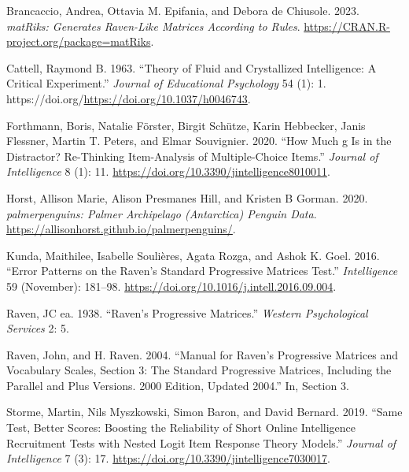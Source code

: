 \label{refs}
\begin{CSLReferences}{1}{0}
Brancaccio, Andrea, Ottavia M. Epifania, and Debora de Chiusole. 2023. \emph{matRiks: Generates Raven-Like Matrices According to Rules}. \url{https://CRAN.R-project.org/package=matRiks}.

Cattell, Raymond B. 1963. {``Theory of Fluid and Crystallized Intelligence: A Critical Experiment.''} \emph{Journal of Educational Psychology} 54 (1): 1. https://doi.org/\url{https://doi.org/10.1037/h0046743}.

Forthmann, Boris, Natalie Förster, Birgit Schütze, Karin Hebbecker, Janis Flessner, Martin T. Peters, and Elmar Souvignier. 2020. {``How {Much} g {Is} in the {Distractor}? {Re}-{Thinking} {Item}-{Analysis} of {Multiple}-{Choice} {Items}.''} \emph{Journal of Intelligence} 8 (1): 11. \url{https://doi.org/10.3390/jintelligence8010011}.

Horst, Allison Marie, Alison Presmanes Hill, and Kristen B Gorman. 2020. \emph{{palmerpenguins}: Palmer Archipelago (Antarctica) Penguin Data}. \url{https://allisonhorst.github.io/palmerpenguins/}.

Kunda, Maithilee, Isabelle Soulières, Agata Rozga, and Ashok K. Goel. 2016. {``Error Patterns on the {Raven}'s {Standard} {Progressive} {Matrices} {Test}.''} \emph{Intelligence} 59 (November): 181--98. \url{https://doi.org/10.1016/j.intell.2016.09.004}.

Raven, JC ea. 1938. {``Raven's Progressive Matrices.''} \emph{Western Psychological Services} 2: 5.

Raven, John, and H. Raven. 2004. {``Manual for {Raven}'s {Progressive} {Matrices} and {Vocabulary} {Scales}, {Section} 3: {The} {Standard} {Progressive} {Matrices}, {Including} the {Parallel} and {Plus} {Versions}. 2000 {Edition}, Updated 2004.''} In, Section 3.

Storme, Martin, Nils Myszkowski, Simon Baron, and David Bernard. 2019. {``Same {Test}, {Better} {Scores}: {Boosting} the {Reliability} of {Short} {Online} {Intelligence} {Recruitment} {Tests} with {Nested} {Logit} {Item} {Response} {Theory} {Models}.''} \emph{Journal of Intelligence} 7 (3): 17. \url{https://doi.org/10.3390/jintelligence7030017}.

\end{CSLReferences}


